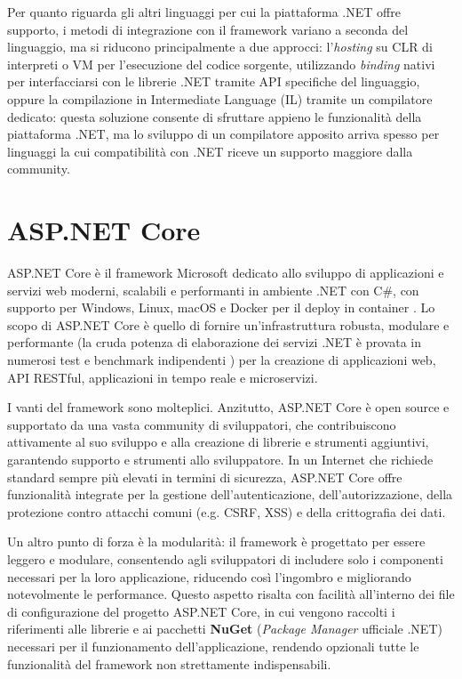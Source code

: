 Per quanto riguarda gli altri linguaggi per cui la piattaforma .NET offre supporto, i metodi di integrazione con il framework variano a seconda del linguaggio, ma si riducono principalmente a due approcci: l'\emph{hosting} su CLR di interpreti o VM per l'esecuzione del codice sorgente, utilizzando \emph{binding} nativi per interfacciarsi con le librerie .NET tramite API specifiche del linguaggio, oppure la compilazione in Intermediate Language (IL) tramite un compilatore dedicato: questa soluzione consente di sfruttare appieno le funzionalità della piattaforma .NET, ma lo sviluppo di un compilatore apposito arriva spesso per linguaggi la cui compatibilità con .NET riceve un supporto maggiore dalla community.

\section{ASP.NET Core}
ASP.NET Core è il framework Microsoft dedicato allo sviluppo di applicazioni e servizi web moderni, scalabili e performanti in ambiente .NET con C\#, con supporto per Windows, Linux, macOS e Docker per il deploy in container \cite{aspdotnet_site}.
Lo scopo di ASP.NET Core è quello di fornire un'infrastruttura robusta, modulare e performante (la cruda potenza di elaborazione dei servizi .NET è provata in numerosi test e benchmark indipendenti \cite{benchmark}) per la creazione di applicazioni web, API RESTful, applicazioni in tempo reale e microservizi.

I vanti del framework sono molteplici. Anzitutto, ASP.NET Core è open source e supportato da una vasta community di sviluppatori, che contribuiscono attivamente al suo sviluppo e alla creazione di librerie e strumenti aggiuntivi, garantendo supporto e strumenti allo sviluppatore.
In un Internet che richiede standard sempre più elevati in termini di sicurezza, ASP.NET Core offre funzionalità integrate per la gestione dell'autenticazione, dell'autorizzazione, della protezione contro attacchi comuni (e.g. CSRF, XSS) e della crittografia dei dati.

Un altro punto di forza è la modularità: il framework è progettato per essere leggero e modulare, consentendo agli sviluppatori di includere solo i componenti necessari per la loro applicazione, riducendo così l'ingombro e migliorando notevolmente le performance.
Questo aspetto risalta con facilità all'interno dei file di configurazione del progetto ASP.NET Core, in cui vengono raccolti i riferimenti alle librerie e ai pacchetti \textbf{NuGet} (\emph{Package Manager} ufficiale .NET) necessari per il funzionamento dell'applicazione, rendendo opzionali tutte le funzionalità del framework non strettamente indispensabili.

